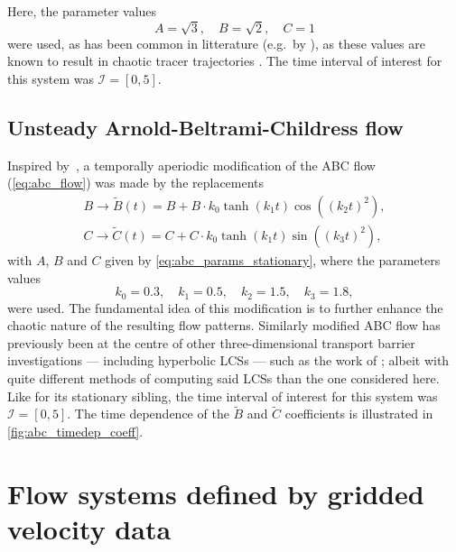 Here, the parameter values
\begin{equation}
    \label{eq:abc_params_stationary}
    A = \sqrt{3},\quad B = \sqrt{2},\quad C = 1
\end{equation}
were used, as has been common in litterature (e.g.\ by
\textcite{oettinger2016autonomous}), as these values are known to result in
chaotic tracer trajectories \parencite{zhao1993chaotic}. The time interval of
interest for this system was $\mathcal{I}=[0,5]$.

\subsection{Unsteady Arnold-Beltrami-Childress flow}%
\label{sub:unsteady_arnold_beltrami_childress_flow}

Inspired by~\textcite{oettinger2016autonomous}, a temporally aperiodic
modification of the ABC flow (\cref{eq:abc_flow}) was made by the replacements
\begin{equation}
    \label{eq:abc_params_nonstationary}
    \begin{gathered}
    B\to{}\widetilde{B}(t) = B + B\cdot{}k_{0}\tanh(k_{1}t)\cos({({k_{2}t})}^{2}),\\
    C\to{}\widetilde{C}(t) = C + C\cdot{}k_{0}\tanh(k_{1}t)\sin({({k_{3}t})}^{2}),
    \end{gathered}
\end{equation}
with $A$, $B$ and $C$ given by \cref{eq:abc_params_stationary}, where the
parameters values
\begin{equation}
    \label{eq:abc_params_nonstationary_frequencies}
    k_{0}=0.3,\quad k_{1}=0.5,\quad k_{2}=1.5,\quad k_{3}=1.8,
\end{equation}
were used. The fundamental idea of this modification is to further enhance
the chaotic nature of the resulting flow patterns. Similarly modified
ABC flow has previously been at the centre of other three-dimensional transport
barrier investigations --- including hyperbolic LCSs --- such as the work of
\textcite{blazevski2014hyperbolic}; albeit with quite different methods of
computing said LCSs than the one considered here. Like for its stationary
sibling, the time interval of interest for this system was $\mathcal{I}=[0,5]$.
The time dependence of the $\widetilde{B}$ and  $\widetilde{C}$ coefficients is
illustrated in \cref{fig:abc_timedep_coeff}.



\section{Flow systems defined by gridded velocity data}
\label{sec:flow_systems_defined_by_gridded_velocity_data}

